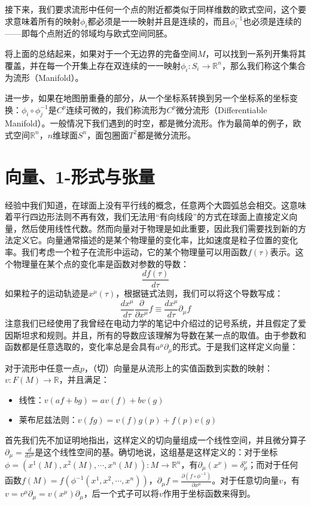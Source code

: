 \documentclass{ctexart}
\begin{document}
接下来，我们要求流形中任何一个点的附近都类似于同样维数的欧式空间，这个要求意味着所有的映射$\phi_i$都必须是一一映射并且是连续的，而且$\phi_i^{-1}$也必须是连续的——即每个点附近的邻域均与欧式空间同胚。

将上面的总结起来，如果对于一个无边界的完备空间$M$，可以找到一系列开集将其覆盖，并在每一个开集上存在双连续的一一映射$\phi_i:S_i\to\mathbb{R}^n$，那么我们称这个集合为流形（Manifold）。

进一步，如果在地图册重叠的部分，从一个坐标系转换到另一个坐标系的坐标变换：$\phi_i\circ \phi_j^{-1}$是$C^p$连续可微的，我们称流形为$C^p$微分流形（Differentiable Manifold）。一般情况下我们遇到的时空，都是微分流形。作为最简单的例子，欧式空间$\mathbb{R}^n$，$n$维球面$S^n$，面包圈面$T^2$都是微分流形。

\section{向量、1-形式与张量}
经验中我们知道，在球面上没有平行线的概念，任意两个大圆弧总会相交。这意味着平行四边形法则不再有效，我们无法用“有向线段”的方式在球面上直接定义向量，然后使用线性代数。然而向量对于物理是如此重要，因此我们需要找到新的方法定义它。向量通常描述的是某个物理量的变化率，比如速度是粒子位置的变化率。我们考虑一个粒子在流形中运动，它的某个物理量可以用函数$f(\tau)$表示。这个物理量在某个点的变化率是函数对参数的导数：
\begin{equation}
\frac{df(\tau)}{d\tau}
\end{equation}
如果粒子的运动轨迹是$x^\mu(\tau)$，根据链式法则，我们可以将这个导数写成：
\begin{equation}
\frac{d x^\mu}{d\tau}\frac{\partial}{\partial x^\mu}f\equiv \frac{d x^\mu}{d\tau}\partial_\mu f
\end{equation}
注意我们已经使用了我曾经在电动力学的笔记中介绍过的记号系统，并且假定了爱因斯坦求和规则。并且，所有的导数应该理解为导数在某一点的取值。由于参数和函数都是任意选取的，变化率总是会具有$a^\mu\partial_\mu$的形式。于是我们这样定义向量：

对于流形中任意一点$p$，（切）向量是从流形上的实值函数到实数的映射：$v:F(M)\to\mathbb{R}$，并且满足：
\begin{itemize}
\item 线性：$v(af+bg)=av(f)+bv(g)$
\item 莱布尼兹法则：$v(fg)=v(f)g(p)+f(p)v(g)$
\end{itemize}
首先我们先不加证明地指出，这样定义的切向量组成一个线性空间，并且微分算子$\partial_\mu=\frac{d}{dx^\mu}$是这个线性空间的基。确切地说，这组基是这样定义的：对于坐标$\phi=(x^1(M),x^2(M),\cdots,x^n(M)):M\to\mathbb{R}^n$，有$\partial_\mu(x^\nu)=\delta_\mu^\nu$；而对于任何函数$f(M)=f(\phi^{-1}(x^1,x^2,\cdots,x^n))$，$\partial_\mu f=\frac{\partial (f\circ\phi^{-1})}{\partial x^\mu}$。对于任意切向量$v$，有$v=v^\mu\partial_\mu=v(x^\mu)\partial_\mu$，后一个式子可以将$v$作用于坐标函数来得到。
\end{document}

